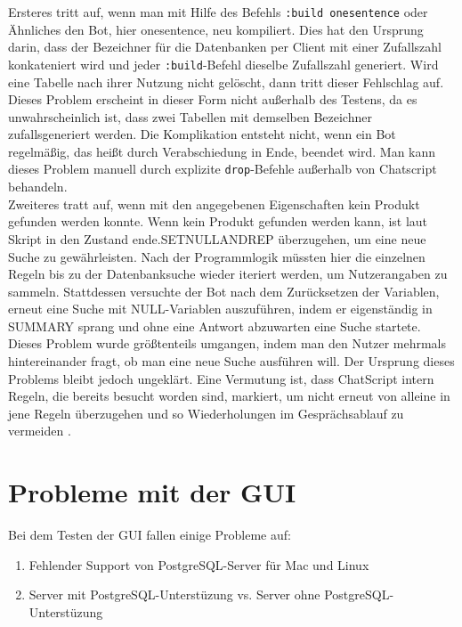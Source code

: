 Ersteres tritt auf, wenn man mit Hilfe des Befehls \lstinline|:build onesentence| oder Ähnliches den Bot, hier onesentence, neu kompiliert. Dies hat den Ursprung darin, dass der Bezeichner für die Datenbanken per Client mit einer Zufallszahl konkateniert wird und jeder \lstinline|:build|-Befehl dieselbe Zufallszahl generiert. Wird eine Tabelle nach ihrer Nutzung nicht gelöscht, dann tritt dieser Fehlschlag auf.\\
Dieses Problem erscheint in dieser Form nicht außerhalb des Testens, da es unwahrscheinlich ist, dass zwei Tabellen mit demselben Bezeichner zufallsgeneriert werden. Die Komplikation entsteht nicht, wenn ein Bot regelmäßig, das heißt durch Verabschiedung in Ende, beendet wird. Man kann dieses Problem manuell durch explizite \lstinline|drop|-Befehle außerhalb von Chatscript behandeln.\\
Zweiteres tratt auf, wenn mit den angegebenen Eigenschaften kein Produkt gefunden werden konnte. Wenn kein Produkt gefunden werden kann, ist laut Skript in den Zustand \texttildelow ende.SETNULLANDREP überzugehen, um eine neue Suche zu gewährleisten. Nach der Programmlogik müssten hier die einzelnen Regeln bis zu der Datenbanksuche wieder iteriert werden, um Nutzerangaben zu sammeln. Stattdessen versuchte der Bot nach dem Zurücksetzen der Variablen, erneut eine Suche mit NULL-Variablen auszuführen, indem er eigenständig in SUMMARY sprang und ohne eine Antwort abzuwarten eine Suche startete.\\
Dieses Problem wurde größtenteils umgangen, indem man den Nutzer mehrmals hintereinander fragt, ob man eine neue Suche ausführen will. Der Ursprung dieses Problems bleibt jedoch ungeklärt. Eine Vermutung ist, dass ChatScript intern Regeln, die bereits besucht worden sind, markiert, um nicht erneut von alleine in jene Regeln überzugehen und so Wiederholungen im Gesprächsablauf zu vermeiden \citep{chatscript2019}.\\


\section{Probleme mit der GUI}
\label{sec: Probleme mit der GUI}

Bei dem Testen der GUI fallen einige Probleme auf: 

\begin{enumerate}
\item{Fehlender Support von PostgreSQL-Server für Mac und Linux}
\item{Server mit PostgreSQL-Unterstüzung vs. Server ohne PostgreSQL-Unterstüzung}
\end{enumerate}

